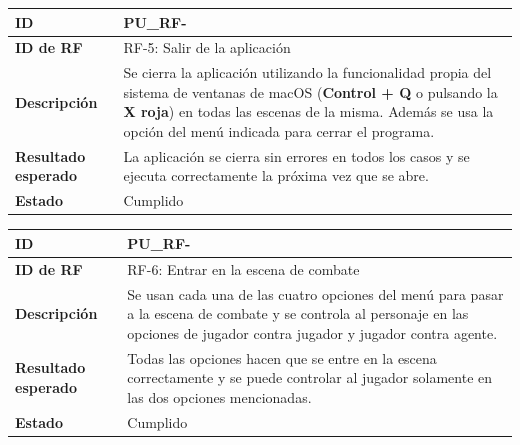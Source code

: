 \begin{center}
	\begin{tabular}{ | p{3cm} | p{10cm} | } 
		\hline
		
		\textbf{ID} & PU\_RF-\arabic{contador_pruebas_funcionales}
		{contador_pruebas_funcionales} \\
		
		\hline 
		\textbf{ID de RF} &
		RF-5: Salir de la aplicación\\ 
		
		\hline
		\textbf{Descripción} & 
		Se cierra la aplicación utilizando la funcionalidad propia del sistema de ventanas de macOS (\textbf{Control + Q} o pulsando la \textbf{X roja}) en todas las escenas de la misma. Además se usa la opción del menú indicada para cerrar el programa.\\
		
		\hline 
		\textbf{Resultado esperado} &
		La aplicación se cierra sin errores en todos los casos y se ejecuta correctamente la próxima vez que se abre.\\ 
		
		\hline 
		\textbf{Estado} &
		Cumplido\\ 
		
		\hline
	\end{tabular}
\end{center}

\begin{center}
	\begin{tabular}{ | p{3cm} | p{10cm} | } 
		\hline
		
		\textbf{ID} & PU\_RF-\arabic{contador_pruebas_funcionales}
		{contador_pruebas_funcionales} \\
		
		\hline 
		\textbf{ID de RF} &
		RF-6: Entrar en la escena de combate\\ 
		
		\hline
		\textbf{Descripción} & 
		Se usan cada una de las cuatro opciones del menú para pasar a la escena de combate y se controla al personaje en las opciones de jugador contra jugador y jugador contra agente.\\
		
		\hline 
		\textbf{Resultado esperado} &
		Todas las opciones hacen que se entre en la escena correctamente y se puede controlar al jugador solamente en las dos opciones mencionadas.\\ 
		
		\hline 
		\textbf{Estado} &
		Cumplido\\ 
		
		\hline
	\end{tabular}
\end{center}

